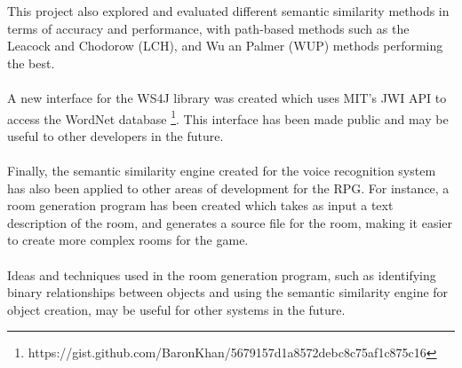 \documentclass[11pt]{article}
\begin{document}
This project also explored and evaluated different semantic similarity methods in terms of accuracy and performance, with path-based methods such as the Leacock and Chodorow (LCH), and Wu an Palmer (WUP) methods performing the best.
\\
\\
A new interface for the WS4J library was created which uses MIT's JWI API to access the WordNet database \footnote{https://gist.github.com/BaronKhan/5679157d1a8572debc8c75af1c875c16}. This interface has been made public and may be useful to other developers in the future.
\\
\\
Finally, the semantic similarity engine created for the voice recognition system has also been applied to other areas of development for the RPG. For instance, a room generation program has been created which takes as input a text description of the room, and generates a source file for the room, making it easier to create more complex rooms for the game.
\\
\\
Ideas and techniques used in the room generation program, such as identifying binary relationships between objects and using the semantic similarity engine for object creation, may be useful for other systems in the future.
\end{document}
